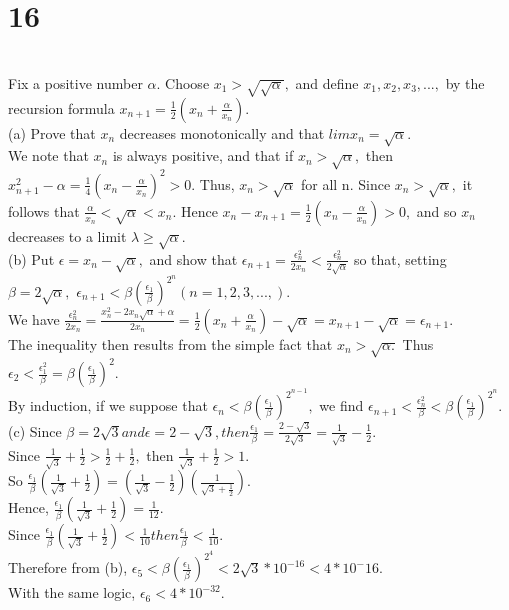 \section*{16}\\ 
Fix a positive number $\alpha.$ Choose $x_1> \sqrt{\sqrt{\alpha}},$ and define $x_1, x_2, x_3,...,$ by the recursion formula $x_{n+1}=\frac{1}{2}(x_n +\frac{\alpha}{x_n}).$\\ 
(a) Prove that ${x_n}$ decreases monotonically and that $lim x_n = \sqrt{\alpha}.$\\ 
We note that $x_n$ is always positive, and that if $x_n > \sqrt{\alpha},$ then $x_{n+1}^2-\alpha =\frac{1}{4}(x_n - \frac{\alpha}{x_n})^2 >0.$ Thus, $x_n > \sqrt{\alpha}$ for all n. Since $x_n > \sqrt{\alpha},$ it follows that $\frac{\alpha}{x_n}<\sqrt{\alpha}<x_n.$ Hence $x_n - x_{n+1}=\frac{1}{2}(x_n-\frac{\alpha}{x_n})>0,$ and so ${x_n}$ decreases to a limit $\lambda \geq \sqrt{\alpha}.$\\ 
(b) Put $\epsilon =x_n- \sqrt{\alpha},$ and show that $\epsilon_{n+1}= \frac{\epsilon _n ^2}{2 x_n}<\frac{\epsilon_n^2}{2 \sqrt{\alpha}}$ so that, setting $\beta=2 \sqrt{\alpha},$
$\epsilon_{n+1}< \beta(\frac{\epsilon_1}{\beta})^{2^n} (n=1,2,3,...,).$\\ 
We have $\frac{\epsilon_n^2}{2x_n}=\frac{x_n^2-2x_n \sqrt{\alpha}+\alpha}{2x_n}=\frac{1}{2}(x_n + \frac{\alpha}{x_n})- \sqrt{\alpha}=x_{n+1}-\sqrt{\alpha}=\epsilon_{n+1}.$\\ 
The inequality then results from the simple fact that $x_n > \sqrt{\alpha.}$ Thus $\epsilon_2< \frac{\epsilon_1 ^2}{\beta}= \beta (\frac{\epsilon_1}{\beta})^2.$ \\ 
By induction, if we suppose that $\epsilon_n < \beta (\frac{\epsilon_1}{\beta})^{2^{n-1}},$ we find $\epsilon_{n+1}<\frac{\epsilon_n^2}{\beta}<\beta (\frac{\epsilon_1}{\beta})^{2^n}.$\\



(c) Since $\beta=2\sqrt{3} and \epsilon=2-\sqrt{3}, then \frac{\epsilon_1}{\beta}=\frac{2-\sqrt{3}}{2\sqrt{3}}=\frac{1}{\sqrt{3}}-\frac{1}{2}.$\\ 
Since $\frac{1}{\sqrt{3}}+\frac{1}{2}>\frac{1}{2}+\frac{1}{2},$ then $\frac{1}{\sqrt{3}}+\frac{1}{2}>1.$ \\ 
So $\frac{\epsilon_1}{\beta}(\frac{1}{\sqrt{3}}+\frac{1}{2})=(\frac{1}{\sqrt{3}}-\frac{1}{2})(\frac{1}{\sqrt{3}+\frac{1}{2}}).$\\ 
Hence, $\frac{\epsilon_1}{\beta}(\frac{1}{\sqrt{3}}+\frac{1}{2})=\frac{1}{12}.$ \\ 
Since $\frac{\epsilon_1}{\beta}(\frac{1}{\sqrt{3}}+\frac{1}{2})<\frac{1}{10} then \frac{\epsilon_1}{\beta}<\frac{1}{10}.$\\ 
Therefore from (b), $\epsilon_5< \beta (\frac{\epsilon_1}{\beta})^{2^4}<2\sqrt{3}*10^{-16}<4*10^-16.$ \\ 
With the same logic, $\epsilon_6<4*10^{-32}.$



